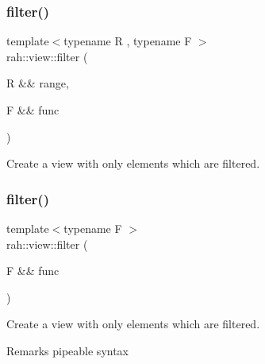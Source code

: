 \subsubsection{\texorpdfstring{filter()}{filter()}\hspace{0.1cm}{\footnotesize\ttfamily [1/2]}}
{\footnotesize\ttfamily template$<$typename R , typename F $>$ \\
rah\+::view\+::filter (\begin{DoxyParamCaption}\item[{R \&\&}]{range,  }\item[{F \&\&}]{func }\end{DoxyParamCaption})}



Create a view with only elements which are filtered. 


\begin{DoxyCodeInclude}{0}
\end{DoxyCodeInclude}
\mbox{\label{namespacerah_1_1view_aa52c6f5cff4e0a4f0ed48c66e1039e3d}} 
\subsubsection{\texorpdfstring{filter()}{filter()}\hspace{0.1cm}{\footnotesize\ttfamily [2/2]}}
{\footnotesize\ttfamily template$<$typename F $>$ \\
rah\+::view\+::filter (\begin{DoxyParamCaption}\item[{F \&\&}]{func }\end{DoxyParamCaption})}



Create a view with only elements which are filtered. 

\begin{DoxyRemark}{Remarks}
pipeable syntax
\end{DoxyRemark}

